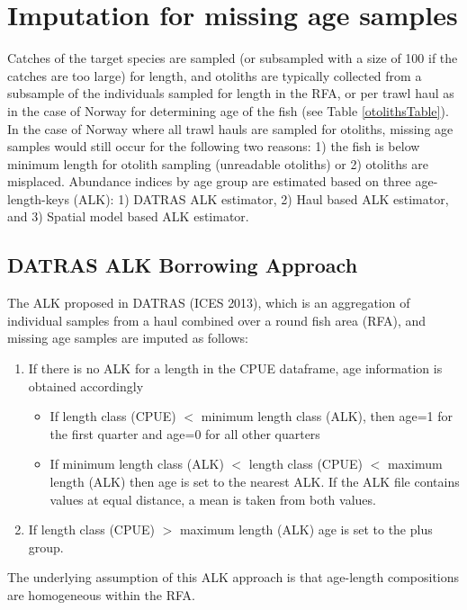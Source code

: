 \documentclass[a4paper 12pt]{article}
\numberwithin{equation}{section}
\begin{document}
\section{\large Imputation for missing age samples}
\label{sec:imputationappendix}
Catches of the target species are sampled (or subsampled with a size of 100 if the catches are too large) for length, and otoliths are typically collected from a subsample of the individuals sampled for length in the RFA,  or per trawl haul as in the case of Norway for determining age of the fish (see Table \ref{otolithsTable}). In the case of Norway where all trawl hauls are sampled for otoliths, missing age samples would still occur for the following two reasons: 1) the fish is below minimum length for otolith sampling (unreadable otoliths) or 2) otoliths are misplaced. Abundance indices by age group are estimated based on three age-length-keys (ALK): 1) DATRAS ALK estimator, 2) Haul based ALK estimator, and 3) Spatial model based ALK estimator.
\subsection{\normalsize DATRAS ALK Borrowing Approach}
\label{secAp:DATRASBorrow}
The ALK proposed in DATRAS (ICES 2013), which is an aggregation of individual samples from a haul combined over a round fish area (RFA), and missing age samples are imputed as follows: 
\begin{enumerate}
\item If there is no ALK for a length in the CPUE dataframe, age information is obtained accordingly
\begin{itemize}
\item If length class (CPUE) $<$ minimum length class (ALK), then age=1 for the first quarter and age=0 for all other quarters
\item  If minimum length class (ALK) $<$ length class (CPUE) $<$ maximum length (ALK) then age is set to the nearest ALK. If the ALK file contains values at equal distance, a mean is taken from both values. 
\end{itemize}
\item If length class (CPUE) $>$ maximum length (ALK) age is set to the plus group.
\end{enumerate}
The underlying assumption of this ALK approach is that age-length compositions are homogeneous within the RFA. 
\end{document}
